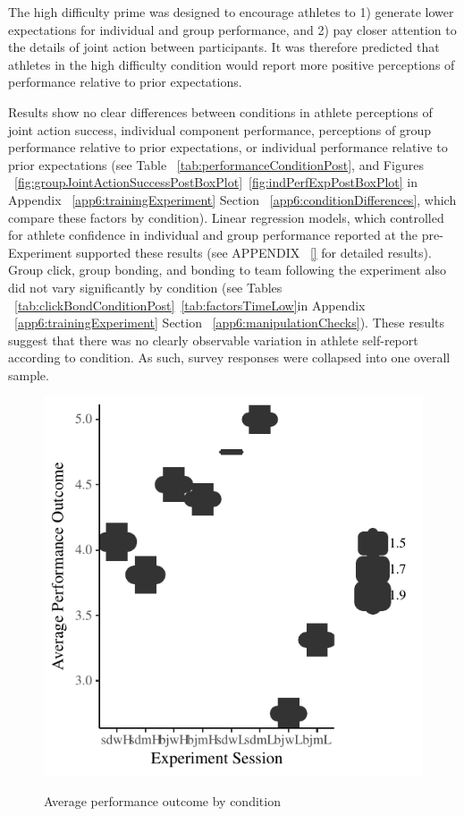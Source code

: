 The high difficulty prime was designed to encourage athletes to 1) generate lower expectations for individual and group performance, and 2) pay closer attention to the details of joint action between participants.  It was therefore predicted that athletes in the high difficulty condition would report more positive perceptions of performance relative to prior expectations.

  \begin{landscape}
    \centering
      
   \end{landscape}
\restoregeometry


 Results show no clear differences between conditions in athlete perceptions of joint action success, individual component performance, perceptions of group performance relative to prior expectations, or individual performance relative to prior expectations (see Table ~\ref{tab:performanceConditionPost}, and Figures ~\ref{fig:groupJointActionSuccessPostBoxPlot}\nobreakdash~\ref{fig:indPerfExpPostBoxPlot} in Appendix ~\ref{app6:trainingExperiment} Section ~\ref{app6:conditionDifferences}, which compare these factors by condition).  Linear regression models, which controlled for athlete confidence in individual and group performance reported at the pre-Experiment supported these results (see APPENDIX ~\ref{} for detailed results). Group click, group bonding, and bonding to team following the experiment also did not vary significantly by condition (see Tables ~\ref{tab:clickBondConditionPost}\nobreakdash~\ref{tab:factorsTimeLow}in Appendix ~\ref{app6:trainingExperiment} Section ~\ref{app6:manipulationChecks}).  These results suggest that there was no clearly observable variation in athlete self-report according to condition.  As such, survey responses were collapsed into one overall sample.



\begin{figure}
  \centering
  \includegraphics[width=0.5\linewidth,keepaspectratio] {images/fullOutcomeAvgSessionBoxplot-1}
  \label{fig:fullOutcomeAvgSessionBoxplot}
  \caption{Average performance outcome by condition}
\end{figure}


